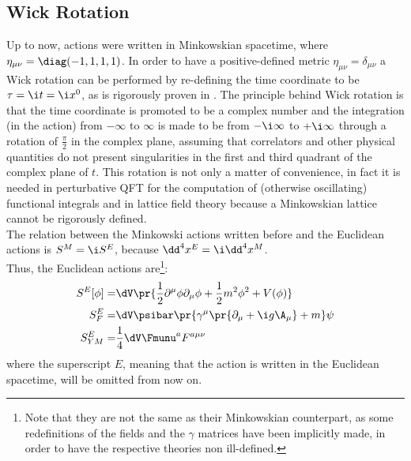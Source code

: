 \begin{comment}
\\Everything that has been said for $\SUN$ can be also extended to $\mathit{SO}(N)$ by replacing \emph{unitary} with \emph{orthogonal} and \emph{traceless} with \emph{antisymmetric}. In fact, this discussion can be made for every compact\footnote{Compactness, \ie $\Tr{T^aT^b}$ positive defined, is required in order to have a bounded from below Hamiltonian.} group, such as the symplectic group $\mathit{Sp}(2N)$ and the five exceptional Lie groups $\mathit{G}(2)$, $\spF$, $\mathit{E}(6)$, $\mathit{E}(7)$ and $\mathit{E}(8)$.
\end{comment}

\subsection{Wick Rotation}
Up to now, actions were written in Minkowskian spacetime, where $\eta_{\mu\nu} = \diag(-1,1,1,1)$. In order to have a positive-defined metric $\eta_{\mu\nu} = \delta_{\mu\nu}$ a Wick rotation can be performed by re-defining the time coordinate to be $\tau = \i t = \i x^0$, as is rigorously proven in \cite{SCHLINGEMANN_1999}.
The principle behind Wick rotation is that the time coordinate is promoted to be a complex number and the integration (in the action) from $-\infty$ to $\infty$ is made to be from $-\i\infty$ to $+\i\infty$ through a rotation of $\frac\pi2$ in the complex plane, assuming that correlators and other physical quantities do not present singularities in the first and third quadrant of the complex plane of $t$.
This rotation is not only a matter of convenience, in fact it is needed in perturbative QFT for the computation of (otherwise oscillating) functional integrals and in lattice field theory because a Minkowskian lattice cannot be rigorously defined.\\
The relation between the Minkowski actions written before and the Euclidean actions is $S^M = \i S^E$, because $\dd^4x^E = \i \dd^4x^M$.\\
Thus, the Euclidean actions are\footnote{Note that they are not the same as their Minkowskian counterpart, as some redefinitions of the fields and the $\gamma$ matrices have been implicitly made, in order to have the respective theories non ill-defined.}:
\begin{align}
    S^E[\phi] =& \dV \pr{\frac12\partial^\mu\phi\partial_\mu\phi+\frac12m^2\phi^2+V(\phi)} \label{1:ScalarActionEuclidean}\\
    S^E_F =& \dV\psibar\pr{\gamma^\mu\pr{\partial_\mu+\i g \A_\mu} + m}\psi \label{1:FerionActionEuclidean}\\
    S^E_{YM} =& \frac14 \dV \Fmunu^a F^{a\mu\nu} \label{1:YMActionEuclidean}
\end{align}
where the superscript $E$, meaning that the action is written in the Euclidean spacetime, will be omitted from now on.

